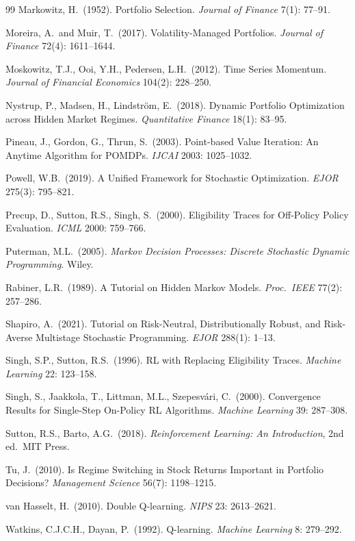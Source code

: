 \documentclass[11pt]{article}
\theoremstyle{plain1}
\theoremstyle{definition1}
\newcommand{\1}{\mathbf{1}}
\begin{document}
\begin{thebibliography}{99}
 Markowitz, H.\ (1952). Portfolio Selection. \emph{Journal of Finance} 7(1): 77--91.

 Moreira, A.\ and Muir, T.\ (2017). Volatility-Managed Portfolios. \emph{Journal of Finance} 72(4): 1611--1644.

 Moskowitz, T.J., Ooi, Y.H., Pedersen, L.H.\ (2012). Time Series Momentum. \emph{Journal of Financial Economics} 104(2): 228--250.

 Nystrup, P., Madsen, H., Lindstr\"om, E.\ (2018). Dynamic Portfolio Optimization across Hidden Market Regimes. \emph{Quantitative Finance} 18(1): 83--95.

 Pineau, J., Gordon, G., Thrun, S.\ (2003). Point-based Value Iteration: An Anytime Algorithm for POMDPs. \emph{IJCAI} 2003: 1025--1032.

 Powell, W.B.\ (2019). A Unified Framework for Stochastic Optimization. \emph{EJOR} 275(3): 795--821.

 Precup, D., Sutton, R.S., Singh, S.\ (2000). Eligibility Traces for Off-Policy Policy Evaluation. \emph{ICML} 2000: 759--766.

 Puterman, M.L.\ (2005). \emph{Markov Decision Processes: Discrete Stochastic Dynamic Programming}. Wiley.

 Rabiner, L.R.\ (1989). A Tutorial on Hidden Markov Models. \emph{Proc.\ IEEE} 77(2): 257--286.

 Shapiro, A.\ (2021). Tutorial on Risk-Neutral, Distributionally Robust, and Risk-Averse Multistage Stochastic Programming. \emph{EJOR} 288(1): 1--13.

 Singh, S.P., Sutton, R.S.\ (1996). RL with Replacing Eligibility Traces. \emph{Machine Learning} 22: 123--158.

 Singh, S., Jaakkola, T., Littman, M.L., Szepesv\'ari, C.\ (2000). Convergence Results for Single-Step On-Policy RL Algorithms. \emph{Machine Learning} 39: 287--308.

 Sutton, R.S., Barto, A.G.\ (2018). \emph{Reinforcement Learning: An Introduction}, 2nd ed.\ MIT Press.

 Tu, J.\ (2010). Is Regime Switching in Stock Returns Important in Portfolio Decisions? \emph{Management Science} 56(7): 1198--1215.

 van Hasselt, H.\ (2010). Double Q-learning. \emph{NIPS} 23: 2613--2621.

 Watkins, C.J.C.H., Dayan, P.\ (1992). Q-learning. \emph{Machine Learning} 8: 279--292.

\end{thebibliography}
\end{document}
